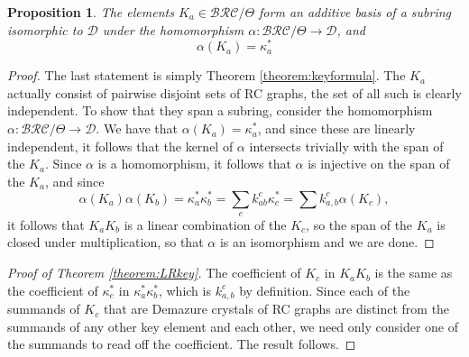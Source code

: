 \documentclass{amsart}
\newtheorem{proposition}[lemma]{Proposition}
\theoremstyle{definition}
\theoremstyle{remark}
\numberwithin{equation}{subsection}
\newcommand{\BRC}{\mathcal{BRC}}
\newcommand{\dcoma}{\mathcal{D}}
\begin{document}
\begin{proposition}
The elements $K_a\in\BRC/\Theta$ form an additive basis of a subring isomorphic to $\dcoma$ under the homomorphism $\alpha:\BRC/\Theta\to \dcoma$, and 
$$\alpha(K_a) = \kappa_a^*$$
\end{proposition}
\begin{proof}
The last statement is simply Theorem \ref{theorem:keyformula}. The $K_a$ actually consist of pairwise disjoint sets of RC graphs, the set of all such is clearly independent. To show that they span a subring, consider the homomorphism $\alpha:\BRC/\Theta\to \dcoma$. We have that $\alpha(K_a)=\kappa_a^*$, and since these are linearly independent, it follows that the kernel of $\alpha$ intersects trivially with the span of the $K_a$. Since $\alpha$ is a homomorphism, it follows that $\alpha$ is injective on the span of the $K_a$, and since 
$$\alpha(K_a)\alpha(K_b) = \kappa_a^*\kappa_b^*=\sum_{c}k_{ab}^c\kappa_c^*=\sum k_{a,b}^c\alpha(K_c),$$ 
it follows that $K_aK_b$ is a linear combination of the $K_c$, so the span of the $K_a$ is closed under multiplication, so that $\alpha$ is an isomorphism and we are done.
\end{proof}

\begin{proof}[Proof of Theorem \ref{theorem:LRkey}]
  The coefficient of $K_c$ in $K_aK_b$ is the same as the coefficient of $\kappa_c^*$ in $\kappa_a^*\kappa_b^*$, which is $k_{a,b}^c$ by definition. Since each of the summands of $K_c$ that are Demazure crystals of RC graphs are distinct from the summands of any other key element and each other, we need only consider one of the summands to read off the coefficient. The result follows.
\end{proof}
\end{document}
